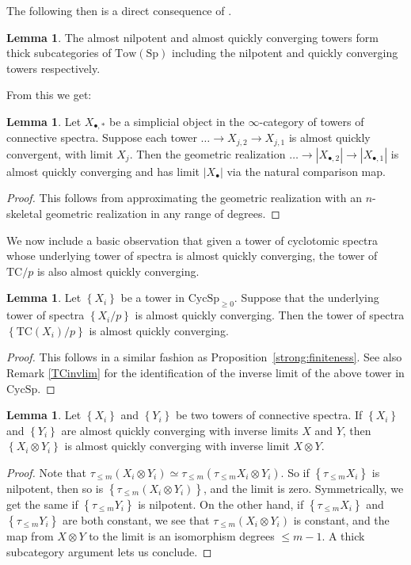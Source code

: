 \documentclass{amsart}
\newcommand{\Sp}{\mathrm{Sp}}
\theoremstyle{definition}
\newtheorem{lemma}[definition]{Lemma}
\newcommand{\CycSp}{\mathrm{CycSp}}
\newcommand{\TC}{\mathrm{TC}}
\begin{document}
The following then is a direct consequence of \cite[Lemma 3.11]{Mthick}. 
\begin{lemma} 
The almost nilpotent and almost quickly converging towers 
form thick subcategories of $\mathrm{Tow}( \Sp)$ including the nilpotent and
quickly converging towers respectively.
\end{lemma} 

From this we get:

\begin{lemma} 
\label{simplicialalmostquickconv}
Let $X_{\bullet, \ast}$ be a simplicial object in the $\infty$-category of
towers of connective spectra. Suppose each tower $\dots \to X_{j,2} \to X_{j,
1}$ is almost quickly convergent, with limit $X_j$. 
Then the geometric realization $\dots \to |X_{\bullet, 2}| \to |X_{\bullet, 1}|$
is almost quickly converging and has limit $\vert X_\bullet \vert$ via the natural comparison map.
\end{lemma} 
\begin{proof} 
This follows from approximating the geometric realization with an $n$-skeletal
geometric realization in any range of degrees. 
\end{proof} 


We now include a basic observation that given a tower of cyclotomic spectra
whose underlying tower of spectra is almost quickly converging, the tower of
$\TC/p$ is also almost quickly converging.  
\begin{lemma} 
\label{TCalmostquickconv}
Let $\left\{X_i\right\}$ be a tower in $\CycSp_{ \geq 0}$.
Suppose that the underlying tower of spectra $\left\{X_i/p\right\}$ is
almost quickly
converging. 
Then the tower of spectra $\left\{\TC(X_i)/p\right\}$ is almost quickly converging.
\end{lemma} 
\begin{proof}  
This follows in a similar fashion as Proposition~\ref{strong:finiteness}. See
also Remark \ref{TCinvlim} for the identification of the inverse limit of the
above tower in $\CycSp$.
\end{proof} 


\begin{lemma} 
\label{transfernilp}
Let $\left\{X_i\right\}$ and $\left\{Y_i\right\}$ be two towers of connective spectra.  If $\left\{X_i\right\}$ and $\left\{Y_i\right\}$ are almost quickly converging with inverse limits $X$ and $Y$, then $\left\{X_i\otimes Y_i\right\}$ is almost quickly converging with inverse limit $X\otimes Y$.
\end{lemma} 
\begin{proof} 
Note that $\tau_{\leq m}( X_i \otimes Y_i) \simeq \tau_{\leq m} ( \tau_{\leq m}
X_i \otimes Y_i)$. So if $\left\{\tau_{\leq m} X_i\right\}$ is nilpotent, then so is 
$\left\{\tau_{\leq m}( X_i \otimes Y_i)\right\}$, and the limit is zero.  Symmetrically, we get the same if $\left\{\tau_{\leq m}Y_i\right\}$ is nilpotent.  On the other hand, if $\left\{\tau_{\leq m}X_i\right\}$ and $\left\{\tau_{\leq m} Y_i\right\}$ are both constant, we see that $\tau_{\leq m} (X_i\otimes Y_i)$ is constant, and the map from $X\otimes Y$ to the limit is an isomorphism degrees $\leq m-1$.  A thick subcategory argument lets us conclude.\end{proof} 
\end{document}
